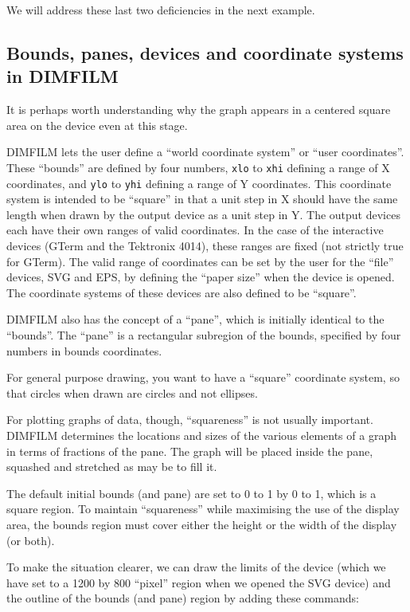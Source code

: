 \documentclass[a4paper,twoside,11pt]{article}
\newcommand{\newpara}{\par\vspace{4mm}\noindent}
\begin{document}
\newpara
We will address these last two deficiencies in the next example.

\subsection{Bounds, panes, devices and coordinate systems in DIMFILM}

\newpara
It is perhaps worth understanding why the graph appears in a centered square area on the device
even at this stage. 

\newpara
DIMFILM lets the user define a ``world coordinate system'' or ``user coordinates''. These ``bounds''
are defined by four numbers,
\texttt{xlo} to \texttt{xhi} defining a range of X coordinates, and
\texttt{ylo} to \texttt{yhi} defining a range of Y coordinates. This
coordinate system is intended to be ``square'' in that a unit step in X
should have the same length when drawn by the output device as a unit
step in Y. The output devices each have their own ranges of valid
coordinates. In the case of the interactive devices (GTerm and the
Tektronix 4014), these ranges are fixed (not strictly true for GTerm).
The valid range of coordinates can be set by the user for the ``file''
devices, SVG and EPS, by defining the ``paper size'' when the device is
opened. The coordinate systems of these devices are also defined to be
``square''.

\newpara
DIMFILM also has the concept of a ``pane'', which is initially identical
to the ``bounds''. The ``pane'' is a rectangular subregion of the
bounds, specified by four numbers in bounds coordinates.

\newpara
For general purpose drawing, you want to have a ``square'' coordinate
system, so that circles when drawn are circles and not ellipses.

\newpara
For plotting graphs of data, though, ``squareness'' is not usually
important. DIMFILM determines the locations and sizes of the various
elements of a graph in terms of fractions of the pane. The graph will be
placed inside the pane, squashed and stretched as may be to fill it.

\newpara
The default initial bounds (and pane) are set to 0 to 1 by 0 to 1, which
is a square region. To maintain ``squareness'' while maximising the use
of the display area, the bounds region must cover either the height or
the width of the display (or both).

\newpara
To make the situation clearer, we can draw the limits of the device
(which we have set to a 1200 by 800 ``pixel'' region when we opened the
SVG device) and the outline of the bounds (and pane) region by adding
these commands:
\end{document}
